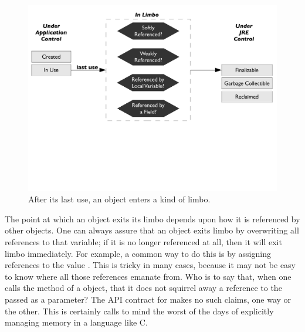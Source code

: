 \begin{figure}
	\centering
	\includegraphics[width=\textwidth]{Figures/lifetime/states}
	\caption{After its last use, an object enters a kind of limbo.}
		\label{fig:limbo-exit}
\end{figure}

The point at which an object exits its limbo depends upon how it is referenced by
other objects. One can always assure that an object exits limbo by overwriting
all references to that variable; if it is no longer referenced at all, then it
will exit limbo immediately. For example, a common way to do this is by assigning
references to the value . This is tricky in many cases, because it may
not be easy to know where all those references emanate from. Who is to say that,
when one calls the  method of a  object, that
it does not squirrel away a reference to the  passed as a
parameter? The API contract for  makes no such claims, one way or the
other. This is certainly calls to mind the worst of the days of explicitly
managing memory in a language like C.



